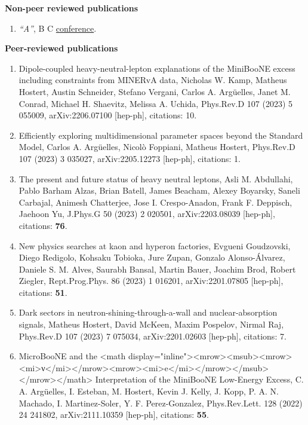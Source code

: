 \documentclass[a4paper,10pt]{article}
\begin{document}
\vspace{1ex}

{\textbf{Non-peer reviewed publications}}
 \begin{enumerate}
 
  \item \textit{``A''}, B C \href{address}{conference}.

\end{enumerate}

\vspace{1ex}


\textbf{Peer-reviewed publications}
\begin{enumerate}
\item Dipole-coupled heavy-neutral-lepton explanations of the MiniBooNE excess including constraints from MINERvA data, Nicholas W. Kamp, Matheus Hostert, Austin Schneider, Stefano Vergani, Carlos A. Argüelles, Janet M. Conrad, Michael H. Shaevitz, Melissa A. Uchida, Phys.Rev.D 107 (2023) 5 055009, arXiv:2206.07100 [hep-ph], citations: 10.
\item Efficiently exploring multidimensional parameter spaces beyond the Standard Model, Carlos A. Argüelles, Nicolò Foppiani, Matheus Hostert, Phys.Rev.D 107 (2023) 3 035027, arXiv:2205.12273 [hep-ph], citations: 1.
\item The present and future status of heavy neutral leptons, Asli M. Abdullahi, Pablo Barham Alzas, Brian Batell, James Beacham, Alexey Boyarsky, Saneli Carbajal, Animesh Chatterjee, Jose I. Crespo-Anadon, Frank F. Deppisch, Jaehoon Yu, J.Phys.G 50 (2023) 2 020501, arXiv:2203.08039 [hep-ph], citations: \textbf{76}.
\item New physics searches at kaon and hyperon factories, Evgueni Goudzovski, Diego Redigolo, Kohsaku Tobioka, Jure Zupan, Gonzalo Alonso-Álvarez, Daniele S. M. Alves, Saurabh Bansal, Martin Bauer, Joachim Brod, Robert Ziegler, Rept.Prog.Phys. 86 (2023) 1 016201, arXiv:2201.07805 [hep-ph], citations: \textbf{51}.
\item Dark sectors in neutron-shining-through-a-wall and nuclear-absorption signals, Matheus Hostert, David McKeen, Maxim Pospelov, Nirmal Raj, Phys.Rev.D 107 (2023) 7 075034, arXiv:2201.02603 [hep-ph], citations: 7.
\item MicroBooNE and the <math display="inline"><mrow><msub><mrow><mi>ν</mi></mrow><mrow><mi>e</mi></mrow></msub></mrow></math> Interpretation of the MiniBooNE Low-Energy Excess, C. A. Argüelles, I. Esteban, M. Hostert, Kevin J. Kelly, J. Kopp, P. A. N. Machado, I. Martinez-Soler, Y. F. Perez-Gonzalez, Phys.Rev.Lett. 128 (2022) 24 241802, arXiv:2111.10359 [hep-ph], citations: \textbf{55}.

\end{enumerate}
\end{document}

